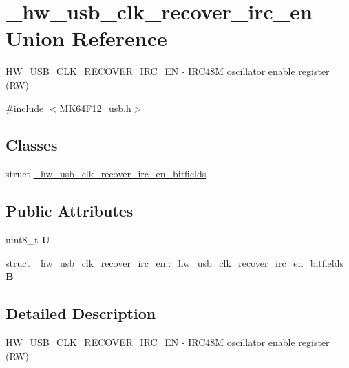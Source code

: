 \hypertarget{union__hw__usb__clk__recover__irc__en}{}\section{\+\_\+hw\+\_\+usb\+\_\+clk\+\_\+recover\+\_\+irc\+\_\+en Union Reference}
\label{union__hw__usb__clk__recover__irc__en}


H\+W\+\_\+\+U\+S\+B\+\_\+\+C\+L\+K\+\_\+\+R\+E\+C\+O\+V\+E\+R\+\_\+\+I\+R\+C\+\_\+\+EN -\/ I\+R\+C48M oscillator enable register (RW)  




{\ttfamily \#include $<$M\+K64\+F12\+\_\+usb.\+h$>$}

\subsection*{Classes}
\begin{DoxyCompactItemize}
\item 
struct \hyperlink{struct__hw__usb__clk__recover__irc__en_1_1__hw__usb__clk__recover__irc__en__bitfields}{\+\_\+hw\+\_\+usb\+\_\+clk\+\_\+recover\+\_\+irc\+\_\+en\+\_\+bitfields}
\end{DoxyCompactItemize}
\subsection*{Public Attributes}
\begin{DoxyCompactItemize}
\item 
uint8\+\_\+t {\bfseries U}\hypertarget{union__hw__usb__clk__recover__irc__en_a7e6885a23128e90544ae2b9d7146cbeb}{}\label{union__hw__usb__clk__recover__irc__en_a7e6885a23128e90544ae2b9d7146cbeb}

\item 
struct \hyperlink{struct__hw__usb__clk__recover__irc__en_1_1__hw__usb__clk__recover__irc__en__bitfields}{\+\_\+hw\+\_\+usb\+\_\+clk\+\_\+recover\+\_\+irc\+\_\+en\+::\+\_\+hw\+\_\+usb\+\_\+clk\+\_\+recover\+\_\+irc\+\_\+en\+\_\+bitfields} {\bfseries B}\hypertarget{union__hw__usb__clk__recover__irc__en_a087d0bf6e6731dfa1953eb82d73e6a9a}{}\label{union__hw__usb__clk__recover__irc__en_a087d0bf6e6731dfa1953eb82d73e6a9a}

\end{DoxyCompactItemize}


\subsection{Detailed Description}
H\+W\+\_\+\+U\+S\+B\+\_\+\+C\+L\+K\+\_\+\+R\+E\+C\+O\+V\+E\+R\+\_\+\+I\+R\+C\+\_\+\+EN -\/ I\+R\+C48M oscillator enable register (RW) 

